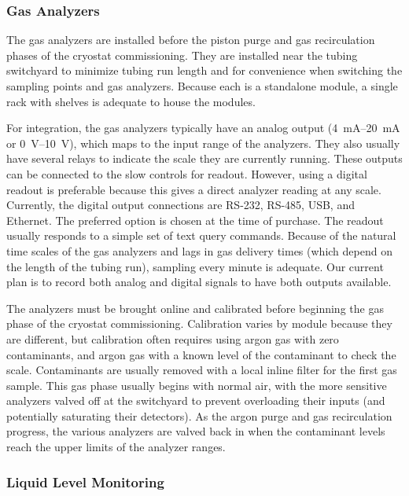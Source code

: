 \subsubsection{Gas Analyzers}
\label{sec:fdgen-slow-cryo-install-ga}

The gas analyzers %
are installed before the piston purge and gas recirculation phases of the cryostat commissioning. They %
are installed near the tubing switchyard to minimize tubing run length and for convenience when switching the sampling points and gas analyzers. Because each is a standalone module, a single rack with shelves %
is adequate to house the modules.

For integration, the gas analyzers typically have an analog output (\SIrange{4}{20}{mA} or \SIrange{0}{10}{V}), which maps to the input range of the analyzers. They also usually have several relays to indicate the scale they are currently running. These outputs can be connected to the slow controls for readout. However, using a digital readout is preferable because this gives a direct analyzer reading at any scale. Currently, the digital output connections are RS-232, RS-485, USB, and Ethernet. The preferred option is chosen at the time of purchase. 
The readout usually responds to a simple set of text query commands. Because of the natural time scales of the gas analyzers and lags in gas delivery times (which depend on the length of the tubing run), sampling every minute is adequate. Our current plan is to record both analog and digital signals to have both outputs available.  

The analyzers %
must be brought online and calibrated before beginning the gas phase of the cryostat commissioning.  Calibration varies by module because they are different, but calibration often requires using argon gas with zero contaminants, and argon gas with a known level of the contaminant to check the scale. Contaminants are usually removed with a local inline filter for the first gas sample. %
This gas phase usually begins with normal air, with the more sensitive analyzers valved off at the switchyard to prevent overloading their inputs (and potentially saturating their detectors). As the argon purge and gas recirculation progress, the various analyzers %
are valved back in when the contaminant levels reach the upper limits of the analyzer ranges. 

\subsubsection{Liquid Level Monitoring}
\label{sec:fdgen-slow-cryo-install-llm}

